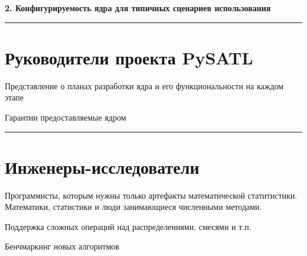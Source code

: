\textbf{2.  Конфигурируемость ядра для типичных сценариев использования}\\

\noindent\rule{\textwidth}{0.5pt}
\section{Руководители проекта PySATL}

\begin{itemizecmp}
    \item Представление о планах разработки ядра и его функциональности на каждом этапе
    \item Гарантии предоставляемые ядром
\end{itemizecmp}

\noindent\rule{\textwidth}{0.5pt}
\section{Инженеры-исследователи}
Программисты, которым нужны только артефакты математической статитистики.  Математики, статистики и люди занимающиеся численными методами.

\begin{itemizecmp}
    \item Поддержка сложных операций над распределениями, смесями и т.п.
    \item Бенчмаркинг новых алгоритмов
\end{itemizecmp}
